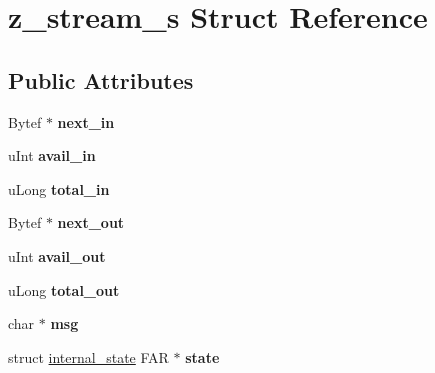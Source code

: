 \hypertarget{structz__stream__s}{\section{z\+\_\+stream\+\_\+s Struct Reference}
\label{structz__stream__s}
}
\subsection*{Public Attributes}
\begin{DoxyCompactItemize}
\item 
\hypertarget{structz__stream__s_a21d2c026f0f2fcd67f33011231f8ed00}{Bytef $\ast$ {\bfseries next\+\_\+in}}\label{structz__stream__s_a21d2c026f0f2fcd67f33011231f8ed00}

\item 
\hypertarget{structz__stream__s_a0cf177f50dbb49692f27480cbcfde794}{u\+Int {\bfseries avail\+\_\+in}}\label{structz__stream__s_a0cf177f50dbb49692f27480cbcfde794}

\item 
\hypertarget{structz__stream__s_aa8f408b9632737dc21519fa1ed34b08d}{u\+Long {\bfseries total\+\_\+in}}\label{structz__stream__s_aa8f408b9632737dc21519fa1ed34b08d}

\item 
\hypertarget{structz__stream__s_aed4a02cfe93e975314fed50b04427bf3}{Bytef $\ast$ {\bfseries next\+\_\+out}}\label{structz__stream__s_aed4a02cfe93e975314fed50b04427bf3}

\item 
\hypertarget{structz__stream__s_a45ad2364307af9d944fd39d4eca3ca3c}{u\+Int {\bfseries avail\+\_\+out}}\label{structz__stream__s_a45ad2364307af9d944fd39d4eca3ca3c}

\item 
\hypertarget{structz__stream__s_abae26f1f236cf920250b9d37fdf009c1}{u\+Long {\bfseries total\+\_\+out}}\label{structz__stream__s_abae26f1f236cf920250b9d37fdf009c1}

\item 
\hypertarget{structz__stream__s_a9b2f745fc780e3b33e2935f8c650a326}{char $\ast$ {\bfseries msg}}\label{structz__stream__s_a9b2f745fc780e3b33e2935f8c650a326}

\item 
\hypertarget{structz__stream__s_ac4a114217a1868dc6fbe7d1f5bda126b}{struct \hyperlink{structinternal__state}{internal\+\_\+state} F\+A\+R $\ast$ {\bfseries state}}\label{structz__stream__s_ac4a114217a1868dc6fbe7d1f5bda126b}


\end{DoxyCompactItemize}
